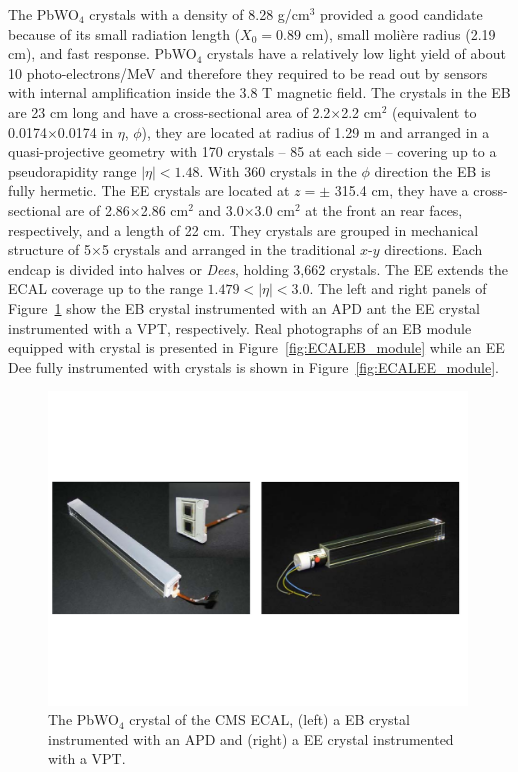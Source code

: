 The PbWO$_{4}$ crystals with a density of 8.28 g/cm$^{3}$ provided a
good candidate because of its small radiation length ($X_{0} = 0.89$
cm), small moli\`ere radius (2.19 cm), and fast response. PbWO$_{4}$
crystals have a relatively low light yield of about 10
photo-electrons/MeV and therefore they required to be read out by
sensors with internal amplification inside the 3.8 T magnetic
field. The crystals in the EB are 23 cm long and have a
cross-sectional area of 2.2$\times$2.2 cm$^{2}$ (equivalent to
0.0174$\times$0.0174 in $\eta$, $\phi$), they are located at radius
of 1.29 m and arranged
in a quasi-projective geometry with 170 crystals -- 85 at each side --  covering up to a pseudorapidity range
$|\eta| < 1.48$. With 360 crystals in the $\phi$  direction the EB is
fully hermetic. The EE crystals are located at $z = \pm$ 315.4 cm, they
have a cross-sectional are of 2.86$\times$2.86 cm$^{2}$  and
3.0$\times$3.0 cm$^{2}$ at the front an rear faces, respectively, and
a length of 22 cm. They crystals are grouped in mechanical structure
of 5$\times$5 crystals and arranged in the traditional $x$-$y$
directions. Each endcap is divided into halves or \textit{Dees},
holding 3,662 crystals. The EE extends the ECAL coverage up to the
range $1.479 < |\eta| < 3.0$. The left and right panels of
Figure~\ref{fig:ECALcrystals} show the EB crystal instrumented with an
APD ant the EE crystal instrumented with a VPT, respectively.  Real
photographs of an EB module equipped with crystal is presented in
Figure~\ref{fig:ECALEB_module} while an EE Dee fully instrumented with crystals is shown
in Figure~\ref{fig:ECALEE_module}.
\begin{figure}
 \centering
\includegraphics[width=0.99\textwidth]{CMS_DetectorFigures/EcalCrytals.pdf}
\caption{The  PbWO$_{4}$ crystal of the CMS ECAL, (left) a EB crystal
  instrumented with an APD and (right) a EE crystal instrumented with a VPT.\label{fig:ECALcrystals}}
\end{figure}
